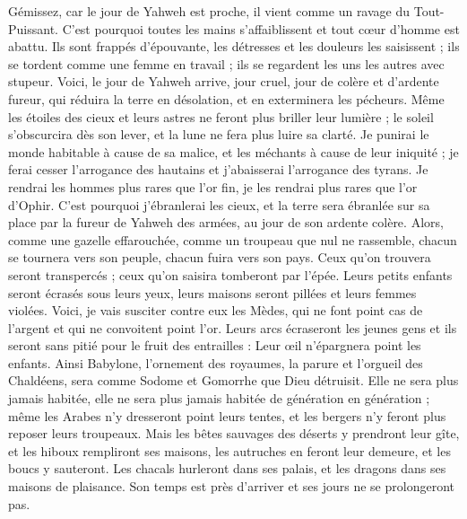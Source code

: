 \begin{multicols}{2}
Gémissez, car le jour de Yahweh est proche, il vient comme un ravage du Tout-Puissant.
C'est pourquoi toutes les mains s'affaiblissent et tout cœur d'homme est abattu.
Ils sont frappés d'épouvante, les détresses et les douleurs les saisissent ; ils se tordent comme une femme en travail ; ils se regardent les uns les autres avec stupeur.
Voici, le jour de Yahweh arrive, jour cruel, jour de colère et d'ardente fureur, qui réduira la terre en désolation, et en exterminera les pécheurs.
Même les étoiles des cieux et leurs astres ne feront plus briller leur lumière ; le soleil s'obscurcira dès son lever, et la lune ne fera plus luire sa clarté.
Je punirai le monde habitable à cause de sa malice, et les méchants à cause de leur iniquité ; je ferai cesser l'arrogance des hautains et j'abaisserai l'arrogance des tyrans.
Je rendrai les hommes plus rares que l'or fin, je les rendrai plus rares que l'or d'Ophir.
C'est pourquoi j'ébranlerai les cieux, et la terre sera ébranlée sur sa place par la fureur de Yahweh des armées, au jour de son ardente colère.
Alors, comme une gazelle effarouchée, comme un troupeau que nul ne rassemble, chacun se tournera vers son peuple, chacun fuira vers son pays.
Ceux qu'on trouvera seront transpercés ; ceux qu'on saisira tomberont par l'épée.
Leurs petits enfants seront écrasés sous leurs yeux, leurs maisons seront pillées et leurs femmes violées.
Voici, je vais susciter contre eux les Mèdes, qui ne font point cas de l'argent et qui ne convoitent point l'or.
Leurs arcs écraseront les jeunes gens et ils seront sans pitié pour le fruit des entrailles : Leur œil n'épargnera point les enfants.
Ainsi Babylone, l'ornement des royaumes, la parure et l'orgueil des Chaldéens, sera comme Sodome et Gomorrhe que Dieu détruisit.
Elle ne sera plus jamais habitée, elle ne sera plus jamais habitée de génération en génération ; même les Arabes n'y dresseront point leurs tentes, et les bergers n'y feront plus reposer leurs troupeaux.
Mais les bêtes sauvages des déserts y prendront leur gîte, et les hiboux rempliront ses maisons, les autruches en feront leur demeure, et les boucs y sauteront.
Les chacals hurleront dans ses palais, et les dragons dans ses maisons de plaisance. Son temps est près d'arriver et ses jours ne se prolongeront pas.

\end{multicols}
